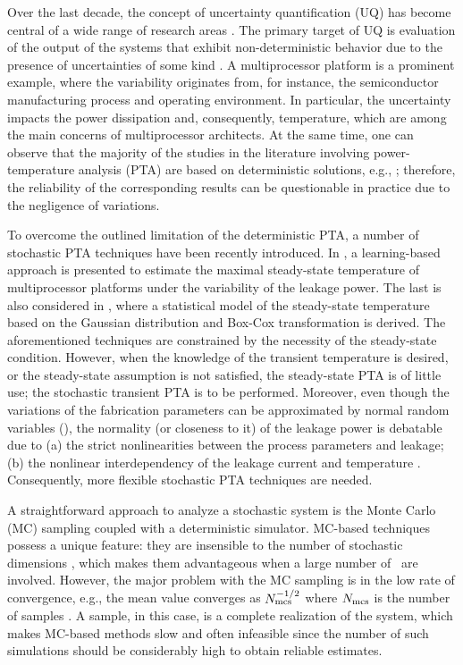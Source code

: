 Over the last decade, the concept of uncertainty quantification (UQ) has become central of a wide range of research areas \cite{xiu2010}. The primary target of UQ is evaluation of the output of the systems that exhibit non-deterministic behavior due to the presence of uncertainties of some kind \cite{eldred2009}. A multiprocessor platform is a prominent example, where the variability originates from, for instance, the semiconductor manufacturing process and operating environment. In particular, the uncertainty impacts the power dissipation and, consequently, temperature, which are among the main concerns of multiprocessor architects. At the same time, one can observe that the majority of the studies in the literature involving power-temperature analysis (PTA) are based on deterministic solutions, e.g., \cite{ukhov2012}; therefore, the reliability of the corresponding results can be questionable in practice due to the negligence of variations.

To overcome the outlined limitation of the deterministic PTA, a number of stochastic PTA techniques have been recently introduced. In \cite{juan2011}, a learning-based approach is presented to estimate the maximal steady-state temperature of multiprocessor platforms under the variability of the leakage power. The last is also considered in \cite{juan2012}, where a statistical model of the steady-state temperature based on the Gaussian distribution and Box-Cox transformation is derived. The aforementioned techniques are constrained by the necessity of the steady-state condition. However, when the knowledge of the transient temperature is desired, or the steady-state assumption is not satisfied, the steady-state PTA is of little use; the stochastic transient PTA is to be performed. Moreover, even though the variations of the fabrication parameters can be approximated by normal random variables (\rvs), the normality (or closeness to it) of the leakage power is debatable due to (a) the strict nonlinearities between the process parameters and leakage; (b) the nonlinear interdependency of the leakage current and temperature \cite{liu2007}. Consequently, more flexible stochastic PTA techniques are needed.

A straightforward approach to analyze a stochastic system is the Monte Carlo (MC) sampling coupled with a deterministic simulator. MC-based techniques possess a unique feature: they are insensible to the number of stochastic dimensions \cite{maitre2010}, which makes them advantageous when a large number of \rvs\ are involved. However, the major problem with the MC sampling is in the low rate of convergence, e.g., the mean value converges as $N_\text{mcs}^{-{{1}/{2}}}$ where $N_\text{mcs}$ is the number of samples \cite{xiu2010, maitre2010}. A sample, in this case, is a complete realization of the system, which makes MC-based methods slow and often infeasible since the number of such simulations should be considerably high to obtain reliable estimates.

